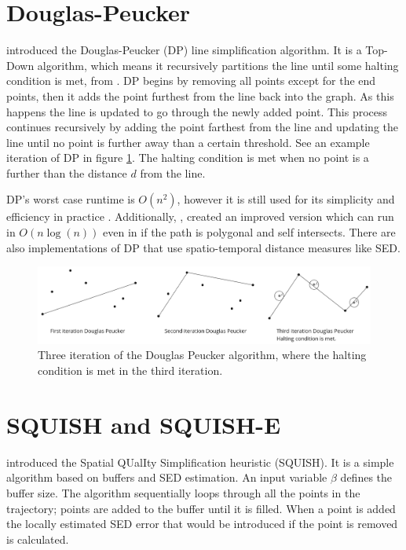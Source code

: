 \section{Douglas-Peucker}
\textcite{dp} introduced the Douglas-Peucker (DP) line simplification algorithm. It is a Top-Down algorithm, which means it recursively partitions the line until some halting condition is met, from \cite{Sun2016}. DP begins by removing all points except for the end points, then it adds the point furthest from the line back into the graph. As this happens the line is updated to go through the newly added point. This process continues recursively by adding the point farthest from the line and updating the line until no point is further away than a certain threshold. See an example iteration of DP in figure \ref{dp}. The halting condition is met when no point is a further than the distance $d$ from the line.

DP's worst case runtime is $O(n^{2})$, however it is still used for its simplicity and efficiency in practice \cite{gudmundsson2009compressing}. Additionally, \textcite{gudmundsson2009compressing}, created an improved version which can run in $O(n\log(n))$ even in if the path is polygonal and self intersects. There are also implementations of DP that use spatio-temporal distance measures like SED.
\begin{figure}[h]
    \includegraphics[width=1.0\linewidth]{./figures/dp.png}
    \caption{Three iteration of the Douglas Peucker algorithm, where the halting condition is met in the third iteration.}
    \label{dp}
\end{figure}

\section{SQUISH and SQUISH-E}
\textcite{muckell2011squish} introduced the Spatial QUalIty Simplification heuristic (SQUISH). It is a simple algorithm based on buffers and SED estimation. An input variable $\beta$ defines the buffer size. The algorithm sequentially loops through all the points in the trajectory; points are added to the buffer until it is filled. When a point is added the locally estimated SED error that would be introduced if the point is removed is calculated.

